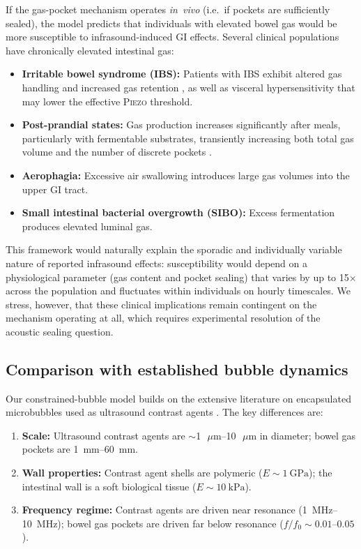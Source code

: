 \documentclass[12pt]{article}
\newcommand{\piezo}{\textsc{Piezo}}
\newcommand{\um}{\ensuremath{\,\mu\text{m}}}
\begin{document}
If the gas-pocket mechanism operates \emph{in~vivo} (i.e.\ if pockets are
sufficiently sealed), the model predicts that individuals with elevated
bowel gas would be more susceptible to infrasound-induced GI effects.
Several clinical populations have chronically elevated intestinal gas:
\begin{itemize}
  \item \textbf{Irritable bowel syndrome (IBS):} Patients with IBS
        exhibit altered gas handling and increased gas retention
        \citep{Serra2001}, as well as visceral hypersensitivity
        that may lower the effective \piezo{} threshold.
  \item \textbf{Post-prandial states:} Gas production increases
        significantly after meals, particularly with fermentable substrates,
        transiently increasing both total gas volume and the number of
        discrete pockets \citep{Harder2003}.
  \item \textbf{Aerophagia:} Excessive air swallowing introduces large
        gas volumes into the upper GI tract.
  \item \textbf{Small intestinal bacterial overgrowth (SIBO):}
        Excess fermentation produces elevated luminal gas.
\end{itemize}

This framework would naturally explain the sporadic and individually variable
nature of reported infrasound effects: susceptibility would depend on a
physiological parameter (gas content and pocket sealing) that varies by up
to 15$\times$ across the population and fluctuates within individuals on
hourly timescales.  We stress, however, that these clinical implications
remain contingent on the mechanism operating at all, which requires
experimental resolution of the acoustic sealing question.

\subsection{Comparison with established bubble dynamics}

Our constrained-bubble model builds on the extensive literature on
encapsulated microbubbles used as ultrasound contrast agents
\citep{Church1995,Hoff2000}.  The key differences are:
\begin{enumerate}
  \item \textbf{Scale:} Ultrasound contrast agents are
        $\sim$\SIrange{1}{10}{\um} in diameter; bowel gas pockets are
        \SIrange{1}{60}{\milli\metre}.
  \item \textbf{Wall properties:} Contrast agent shells are polymeric
        ($E \sim \SI{1}{\giga\pascal}$); the intestinal wall is a soft
        biological tissue ($E \sim \SI{10}{\kilo\pascal}$).
  \item \textbf{Frequency regime:} Contrast agents are driven near
        resonance (\SIrange{1}{10}{\mega\hertz}); bowel gas pockets
        are driven far below resonance ($f/f_0 \sim 0.01$--$0.05$).
\end{enumerate}
\end{document}
